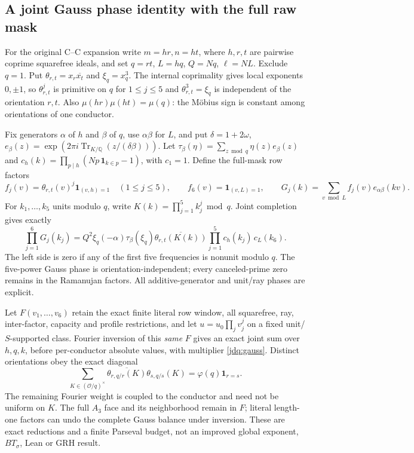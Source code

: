 \subsection{A joint Gauss phase identity with the full raw mask}
\label{jdq:core}
For the original C--C expansion write $m=hr,n=ht$, where $h,r,t$
are pairwise coprime squarefree ideals, and set $q=rt$, $L=hq$,
$Q=Nq$, $\ell=NL$. Exclude $q=1$. Put
$\theta_{r,t}=x_r\overline{x_t}$ and $\xi_q=x_q^3$.
The internal coprimality gives local exponents $0,\pm1$, so
$\theta_{r,t}^j$ is primitive on $q$ for $1\le j\le5$ and
$\theta_{r,t}^3=\xi_q$ is independent of the orientation $r,t$.
Also $\mu(hr)\mu(ht)=\mu(q)$: the M\"obius sign is constant among
orientations of one conductor.

Fix generators $\alpha$ of $h$ and $\beta$ of $q$, use
$\alpha\beta$ for $L$, and put $\delta=1+2\omega$,
$e_\beta(z)=\exp(2\pi i\operatorname{Tr}_{K/\mathbb Q}
(z/(\delta\beta)))$. Let $\tau_\beta(\eta)=\sum_{z\bmod q}
\eta(z)e_\beta(z)$ and
$c_h(k)=\prod_{p\mid h}(Np\,\mathbf1_{k\in p}-1)$, with $c_1=1$.
Define the full-mask row factors
\[
 f_j(v)=\theta_{r,t}(v)^j\mathbf1_{(v,h)=1}\quad(1\le j\le5),
 \qquad f_6(v)=\mathbf1_{(v,L)=1},
 \qquad
 G_j(k)=\sum_{v\bmod L}f_j(v)e_{\alpha\beta}(kv).
\]
For $k_1,\ldots,k_5$ units modulo $q$, write
$K(k)=\prod_{j=1}^5k_j^j\bmod q$. Joint completion gives exactly
\begin{equation}\label{jdq:gauss}
 \prod_{j=1}^6G_j(k_j)
 =Q^2\xi_q(-\alpha)\tau_\beta(\xi_q)
   \overline{\theta_{r,t}(K(k))}
   \prod_{j=1}^5c_h(k_j)\,c_L(k_6).
\end{equation}
The left side is zero if any of the first five frequencies is nonunit
modulo $q$. The five-power Gauss phase is orientation-independent;
every canceled-prime zero remains in the Ramanujan factors.
All additive-generator and unit/ray phases are explicit.

Let $F(v_1,\ldots,v_6)$ retain the exact finite literal row window,
all squarefree, ray, inter-factor, capacity and profile restrictions,
and let $u=u_0\prod_jv_j^j$ on a fixed unit/$S$-supported class.
Fourier inversion of this \emph{same} $F$ gives an exact joint sum over
$h,q,k$, before per-conductor absolute values, with multiplier
\eqref{jdq:gauss}. Distinct orientations obey the exact diagonal
\begin{equation}\label{jdq:orientation}
 \sum_{K\in(\mathcal O/q)^\times}
 \overline{\theta_{r,q/r}(K)}\theta_{s,q/s}(K)
 =\varphi(q)\mathbf1_{r=s}.
\end{equation}
The remaining Fourier weight is coupled to the conductor and need not
be uniform on $K$. The full $A_3$ face and its neighborhood remain in
$F$; literal length-one factors can undo the complete Gauss balance
under inversion. These are exact reductions and a finite Parseval
budget, not an improved global exponent, $BT_\sigma$, Lean or GRH result.
